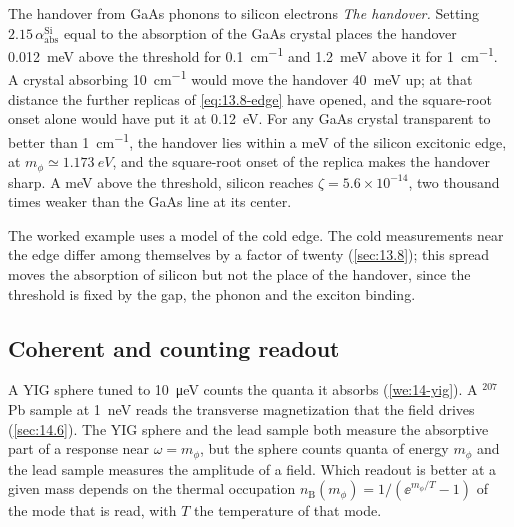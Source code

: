 \begin{workedexample}{The handover from GaAs phonons to silicon electrons}
\emph{The handover.} Setting $2.15\,\alpha_{\mathrm{abs}}^{\mathrm{Si}}$ equal to the absorption of the GaAs crystal places the handover \SI{0.012}{meV} above the threshold for \SI{0.1}{cm^{-1}} and \SI{1.2}{meV} above it for \SI{1}{cm^{-1}}. A crystal absorbing \SI{10}{cm^{-1}} would move the handover \SI{40}{meV} up; at that distance the further replicas of \cref{eq:13.8-edge} have opened, and the square-root onset alone would have put it at \SI{0.12}{eV}. For any GaAs crystal transparent to better than \SI{1}{cm^{-1}}, the handover lies within a meV of the silicon excitonic edge, at $m_\phi \simeq \SI{1.173}{eV}$, and the square-root onset of the replica makes the handover sharp. A meV above the threshold, silicon reaches $\zeta = 5.6\times10^{-14}$, two thousand times weaker than the GaAs line at its center.
\end{workedexample}

The worked example uses a model of the cold edge. The cold measurements near the edge differ among themselves by a factor of twenty (\cref{sec:13.8}); this spread moves the absorption of silicon but not the place of the handover, since the threshold is fixed by the gap, the phonon and the exciton binding.

\subsection{Coherent and counting readout}\label{sec:17.2-coherent}

A YIG sphere tuned to \SI{10}{\micro eV} counts the quanta it absorbs (\cref{we:14-yig}). A $^{207}$Pb sample at \SI{1}{neV} reads the transverse magnetization that the field drives (\cref{sec:14.6}). The YIG sphere and the lead sample both measure the absorptive part of a response near $\omega = m_\phi$, but the sphere counts quanta of energy $m_\phi$ and the lead sample measures the amplitude of a field. Which readout is better at a given mass depends on the thermal occupation $n_{\mathrm{B}}(m_\phi) = 1/(\ee^{m_\phi/T} - 1)$ of the mode that is read, with $T$ the temperature of that mode.

